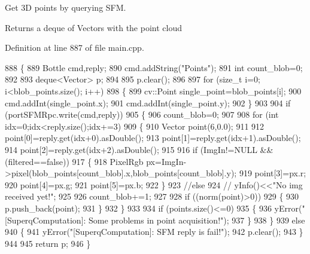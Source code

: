 Get 3\-D points by querying S\-F\-M. 

\begin{DoxyReturn}{Returns}
a deque of Vectors with the point cloud 
\end{DoxyReturn}


Definition at line 887 of file main.\-cpp.


\begin{DoxyCode}
888     \{
889         Bottle cmd,reply;
890         cmd.addString(\textcolor{stringliteral}{"Points"});
891         \textcolor{keywordtype}{int} count\_blob=0;
892 
893         deque<Vector> p;
894 
895         p.clear();
896 
897         \textcolor{keywordflow}{for} (\textcolor{keywordtype}{size\_t} i=0; i<blob\_points.size(); i++)
898         \{
899             cv::Point single\_point=blob\_points[i];
900             cmd.addInt(single\_point.x);
901             cmd.addInt(single\_point.y);
902         \}
903 
904         \textcolor{keywordflow}{if} (portSFMRpc.write(cmd,reply))
905         \{
906             count\_blob=0;
907 
908             \textcolor{keywordflow}{for} (\textcolor{keywordtype}{int} idx=0;idx<reply.size();idx+=3)
909             \{
910                 Vector point(6,0.0);
911 
912                 point[0]=reply.get(idx+0).asDouble();
913                 point[1]=reply.get(idx+1).asDouble();
914                 point[2]=reply.get(idx+2).asDouble();
915 
916                 \textcolor{keywordflow}{if} (ImgIn!=NULL && (filtered==\textcolor{keyword}{false}))
917                 \{
918                     PixelRgb px=ImgIn->pixel(blob\_points[count\_blob].x,blob\_points[count\_blob].y);
919                     point[3]=px.r;
920                     point[4]=px.g;
921                     point[5]=px.b;
922                 \}
923                 \textcolor{comment}{//else}
924                  \textcolor{comment}{//   yInfo()<<"No img received yet!";}
925 
926                 count\_blob+=1;
927 
928                 \textcolor{keywordflow}{if} ((norm(point)>0))
929                 \{
930                     p.push\_back(point);
931                 \}
932             \}
933 
934             \textcolor{keywordflow}{if} (points.size()<=0)
935             \{
936                 yError(\textcolor{stringliteral}{"[SuperqComputation]: Some problems in point acquisition!"});
937             \}
938         \}
939         \textcolor{keywordflow}{else}
940         \{
941             yError(\textcolor{stringliteral}{"[SuperqComputation]: SFM reply is fail!"});
942             p.clear();
943         \}
944 
945         \textcolor{keywordflow}{return} p;
946     \}
\end{DoxyCode}
